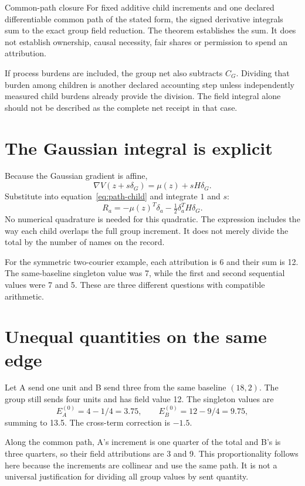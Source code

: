 \begin{lawbox}{Common-path closure}
For fixed additive child increments and one declared differentiable common path of the stated form, the signed derivative integrals sum to the exact group field reduction. The theorem establishes the sum. It does not establish ownership, causal necessity, fair shares or permission to spend an attribution.
\end{lawbox}

If process burdens are included, the group net also subtracts $C_G$. Dividing that burden among children is another declared accounting step unless independently measured child burdens already provide the division. The field integral alone should not be described as the complete net receipt in that case.

\section{The Gaussian integral is explicit}
Because the Gaussian gradient is affine,
\[
 \nabla V(z+s\delta_G)=\mu(z)+sH\delta_G.
\]
Substitute into equation~\eqref{eq:path-child} and integrate $1$ and $s$:
\begin{equation}
 R_a=-\mu(z)^T\delta_a-\tfrac12\delta_a^TH\delta_G.
\end{equation}
No numerical quadrature is needed for this quadratic. The expression includes the way each child overlaps the full group increment. It does not merely divide the total by the number of names on the record.

For the symmetric two-courier example, each attribution is 6 and their sum is 12. The same-baseline singleton value was 7, while the first and second sequential values were 7 and 5. These are three different questions with compatible arithmetic.

\section{Unequal quantities on the same edge}
Let A send one unit and B send three from the same baseline $(18,2)$. The group still sends four units and has field value 12. The singleton values are
\[
 E_A^{(0)}=4-1/4=3.75,\qquad
 E_B^{(0)}=12-9/4=9.75,
\]
summing to 13.5. The cross-term correction is $-1.5$.

Along the common path, A's increment is one quarter of the total and B's is three quarters, so their field attributions are 3 and 9. This proportionality follows here because the increments are collinear and use the same path. It is not a universal justification for dividing all group values by sent quantity.

